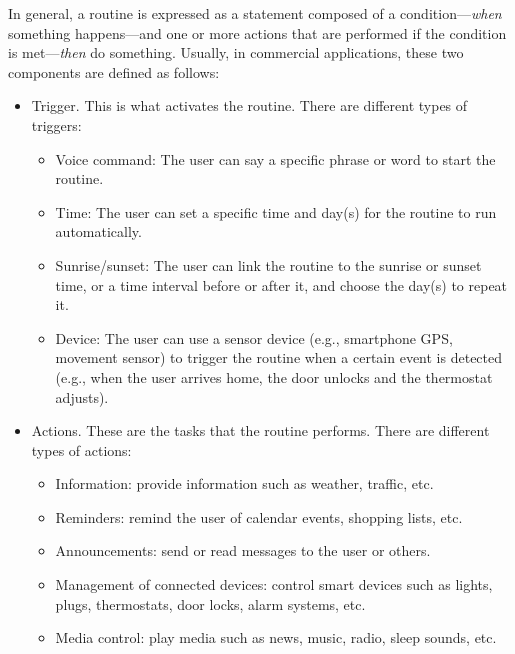 In general, a routine is expressed as a statement composed of a condition---\textit{when} something happens---and one or more actions that are performed if the condition is met---\textit{then} do something. Usually, in commercial applications, these two components are defined as follows:
\begin{itemize}
    \item Trigger. This is what activates the routine. There are different types of triggers:
          \begin{itemize}
              \item Voice command: The user can say a specific phrase or word to start the routine.
              \item Time: The user can set a specific time and day(s) for the routine to run automatically.
              \item Sunrise/sunset: The user can link the routine to the sunrise or sunset time, or a time interval before or after it, and choose the day(s) to repeat it.
              \item Device: The user can use a sensor device (e.g., smartphone GPS, movement sensor) to trigger the routine when a certain event is detected (e.g., when the user arrives home, the door unlocks and the thermostat adjusts).
          \end{itemize}
    \item Actions. These are the tasks that the routine performs. There are different types of actions:
          \begin{itemize}
              \item Information: provide information such as weather, traffic, etc.
              \item Reminders: remind the user of calendar events, shopping lists, etc.
              \item Announcements: send or read messages to the user or others.
              \item Management of connected devices: control smart devices such as lights, plugs, thermostats, door locks, alarm systems, etc.
              \item Media control: play media such as news, music, radio, sleep sounds, etc.
          \end{itemize}
\end{itemize}
